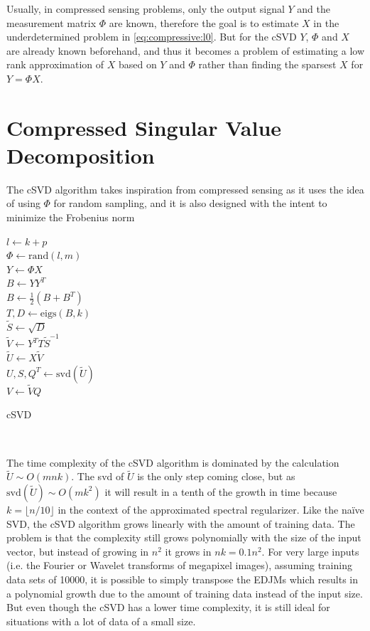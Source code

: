 Usually, in compressed sensing problems, only the output signal $Y$ and the measurement matrix $\Phi$ are known, therefore the goal is to estimate $X$ in the underdetermined problem in \eqref{eq:compressive:l0}. But for the cSVD $Y$, $\Phi$ and $X$ are already known beforehand, and thus it becomes a problem of estimating a low rank approximation of $X$ based on $Y$ and $\Phi$ rather than finding the sparsest $X$ for $Y = \Phi X$.

\section{Compressed Singular Value Decomposition}

The cSVD algorithm takes inspiration from compressed sensing as it uses the idea of using $\Phi$ for random sampling, and it is also designed with the intent to minimize the Frobenius norm

\begin{algorithm}[H]
\SetAlgoLined
{}
$l \gets k + p$ \\
$\Phi \gets \mathrm{rand}(l, m)$ \\
$Y \gets \Phi X$ \\
$B \gets Y Y^T$ \\
$B \gets \frac{1}{2}(B + B^T)$ \\
$T,D \gets \mathrm{eigs}(B,k)$ \\
$\tilde S \gets \sqrt{D}$ \\
$\tilde V \gets Y^T T \tilde S^{-1}$ \\
$\tilde U \gets X \tilde V$ \\
$U,S,Q^T \gets \mathrm{svd}(\tilde U)$ \\ %
$V \gets \tilde V Q$ \\
\caption{cSVD}
\end{algorithm}

$ $ \newline

The time complexity of the cSVD algorithm is dominated by the calculation $\tilde U \sim O(mnk)$. The svd of $\tilde U$ is the only step coming close, but as $\mathrm{svd}(\tilde U) \sim O(mk^2)$ it will result in a tenth of the growth in time because $k = \lfloor n/10 \rfloor$ in the context of the approximated spectral regularizer. Like the naïve SVD, the cSVD algorithm grows linearly with the amount of training data. The problem is that the complexity still grows polynomially with the size of the input vector, but instead of growing in $n^2$ it grows in $nk = 0.1n^2$. For very large inputs (i.e. the Fourier or Wavelet transforms of megapixel images), assuming training data sets of 10000, it is possible to simply transpose the EDJMs which results in a polynomial growth due to the amount of training data instead of the input size. But even though the cSVD has a lower time complexity, it is still ideal for situations with a lot of data of a small size.

